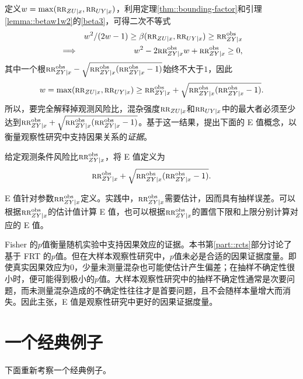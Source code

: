 定义$w = \max( \textsc{rr}_{ZU\mid x} ,  \textsc{rr}_{UY\mid x} )$，利用定理\ref{thm::bounding-factor}和引理\ref{lemma::betaw1w2}的\eqref{beta3}，可得二次不等式
\begin{eqnarray*}
&&w^2/(2w-1) \geq \beta( \textsc{rr}_{ZU\mid x} , \textsc{rr}_{UY\mid x}) \geq \textsc{rr}_{ZY\mid x}^{\textup{obs}} \\ 
&\Longrightarrow & w^2 - 2 \textsc{rr}_{ZY\mid x}^{\textup{obs}} w + \textsc{rr}_{ZY\mid x}^{\textup{obs}} \geq 0,
\end{eqnarray*}
其中一个根$  \textsc{rr}_{ZY\mid x}^{\textup{obs}} - \sqrt{ \textsc{rr}_{ZY\mid x}^{\textup{obs}} (\textsc{rr}_{ZY\mid x}^{\textup{obs}} - 1)} $始终不大于$1$，因此
$$
w = \max( \textsc{rr}_{ZU\mid x} ,  \textsc{rr}_{UY\mid x} ) \geq \textsc{rr}_{ZY\mid x}^{\textup{obs}} + \sqrt{ \textsc{rr}_{ZY\mid x}^{\textup{obs}} (\textsc{rr}_{ZY\mid x}^{\textup{obs}} - 1)} . 
$$
所以，要完全解释掉观测风险比，混杂强度$\textsc{rr}_{ZU\mid x} $和$  \textsc{rr}_{UY\mid x}$中的最大者必须至少达到$\textsc{rr}_{ZY\mid x}^{\textup{obs}} + \sqrt{ \textsc{rr}_{ZY\mid x}^{\textup{obs}} (\textsc{rr}_{ZY\mid x}^{\textup{obs}} - 1)} $。基于这一结果，\citet{vanderweele2017sensitivity}提出下面的 E 值概念，以衡量观察性研究中支持因果关系的{\it 证据}。 

 


\begin{definition}
[E 值]
给定观测条件风险比$\textsc{rr}_{ZY\mid x}^{\textup{obs}}$，将 E 值定义为
$$
\textsc{rr}_{ZY\mid x}^{\textup{obs}} + \sqrt{ \textsc{rr}_{ZY\mid x}^{\textup{obs}} (\textsc{rr}_{ZY\mid x}^{\textup{obs}} - 1)} . 
$$ 
\end{definition}

 
 
E 值针对参数$\textsc{rr}_{ZY\mid x}^{\textup{obs}}$定义。实践中，$\textsc{rr}_{ZY\mid x}^{\textup{obs}}$需要估计，因而具有抽样误差。可以根据$\textsc{rr}_{ZY\mid x}^{\textup{obs}}$的估计值计算 E 值，也可以根据$\textsc{rr}_{ZY\mid x}^{\textup{obs}}$的置信下限和上限分别计算对应的 E 值。 


Fisher 的$p$值衡量随机实验中支持因果效应的证据。本书第\ref{part::rcts}部分讨论了基于 FRT 的$p$值。但在大样本观察性研究中，$p$值未必是合适的因果证据度量。即使真实因果效应为$0$，少量未测量混杂也可能使估计产生偏差；在抽样不确定性很小时，便可能得到极小的$p$值。大样本观察性研究中的抽样不确定性通常是次要问题，而未测量混杂造成的不确定性往往才是首要问题，且不会随样本量增大而消失。\citet{vanderweele2017sensitivity}因此主张，E 值是观察性研究中更好的因果证据度量。 

 


\section{一个经典例子}
\label{sec::evalue-example}


下面重新考察一个经典例子。 


